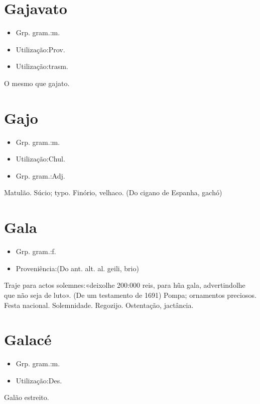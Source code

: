 \section{Gajavato}
\begin{itemize}
\item {Grp. gram.:m.}
\end{itemize}
\begin{itemize}
\item {Utilização:Prov.}
\end{itemize}
\begin{itemize}
\item {Utilização:trasm.}
\end{itemize}
O mesmo que \textunderscore gajato\textunderscore .
\section{Gajo}
\begin{itemize}
\item {Grp. gram.:m.}
\end{itemize}
\begin{itemize}
\item {Utilização:Chul.}
\end{itemize}
\begin{itemize}
\item {Grp. gram.:Adj.}
\end{itemize}
Matulão.
Súcio; typo.
Finório, velhaco.
(Do cigano de Espanha, \textunderscore gachó\textunderscore )
\section{Gala}
\begin{itemize}
\item {Grp. gram.:f.}
\end{itemize}
\begin{itemize}
\item {Proveniência:(Do ant. alt. al. \textunderscore geili\textunderscore , brio)}
\end{itemize}
Traje para actos solemnes:«\textunderscore deixolhe 200:000 reis, para hũa gala, advertindolhe que não seja de luto\textunderscore ». (De um testamento de 1691)
Pompa; ornamentos preciosos.
Festa nacional.
Solemnidade.
Regozijo.
Ostentação, jactância.
\section{Galacé}
\begin{itemize}
\item {Grp. gram.:m.}
\end{itemize}
\begin{itemize}
\item {Utilização:Des.}
\end{itemize}
Galão estreito.
